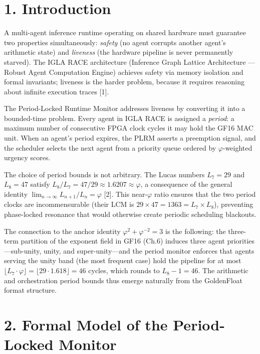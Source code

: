 \section{1. Introduction}\label{fa_24:introduction}

A multi-agent inference runtime operating on
shared hardware must guarantee two properties
simultaneously: \emph{safety} (no agent corrupts
another agent's arithmetic state) and
\emph{liveness} (the hardware pipeline is never
permanently starved). The IGLA RACE architecture
(Inference Graph Lattice Architecture --- Robust
Agent Computation Engine) achieves safety via
memory isolation and formal invariants; liveness
is the harder problem, because it requires
reasoning about infinite execution traces [1].

The Period-Locked Runtime Monitor addresses
liveness by converting it into a bounded-time
problem. Every agent in IGLA RACE is assigned a
\emph{period}: a maximum number of consecutive
FPGA clock cycles it may hold the GF16 MAC unit.
When an agent's period expires, the PLRM asserts a
preemption signal, and the scheduler selects the
next agent from a priority queue ordered by
\(\varphi\)-weighted urgency scores.

The choice of period bounds is not arbitrary. The
Lucas numbers \(L_7 = 29\) and \(L_8 = 47\)
satisfy
\(L_8/L_7 = 47/29 \approx 1.6207 \approx \varphi\),
a consequence of the general identity
\(\lim_{n\to\infty} L_{n+1}/L_n = \varphi\)
[2]. This near-\(\varphi\) ratio ensures that
the two period clocks are incommensurable (their
LCM is
\(29 \times 47 = 1363 = L_{7} \times L_8\)),
preventing phase-locked resonance that would
otherwise create periodic scheduling blackouts.

The connection to the anchor identity
\(\varphi^2 + \varphi^{-2} = 3\) is the following:
the three-term partition of the exponent field in
GF16 (Ch.6) induces three agent
priorities---sub-unity, unity, and
super-unity---and the period monitor enforces that
agents serving the unity band (the most frequent
case) hold the pipeline for at most
\(\lfloor L_7 \cdot \varphi \rfloor = \lfloor 29 \cdot 1.618 \rfloor = 46\)
cycles, which rounds to \(L_8 - 1 = 46\). The
arithmetic and orchestration period bounds thus
emerge naturally from the GoldenFloat format
structure.

\section{2. Formal Model of the Period-Locked
Monitor}\label{fa_24:formal-model-of-the-period-locked-monitor}

